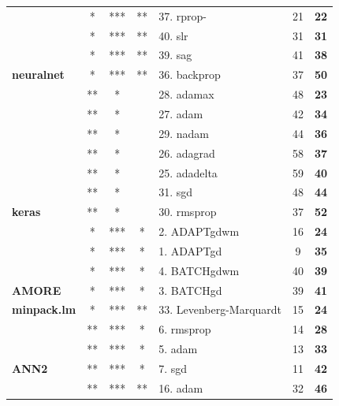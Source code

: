 \begin{Schunk}
\begin{table}
\begin{tabular}[t]{>{}lccclc>{}c}
 & * & *** & ** & 37. rprop- & 21 & \textbf{22}\\

 & * & *** & ** & 40. slr & 31 & \textbf{31}\\

 & * & *** & ** & 39. sag & 41 & \textbf{38}\\

\multirow{-5}{*}{\raggedright\arraybackslash \textbf{neuralnet}} & * & *** & ** & 36. backprop & 37 & \textbf{50}\\
\cmidrule{1-7}
 & ** & * &  & 28. adamax & 48 & \textbf{23}\\

 & ** & * &  & 27. adam & 42 & \textbf{34}\\

 & ** & * &  & 29. nadam & 44 & \textbf{36}\\

 & ** & * &  & 26. adagrad & 58 & \textbf{37}\\

 & ** & * &  & 25. adadelta & 59 & \textbf{40}\\

 & ** & * &  & 31. sgd & 48 & \textbf{44}\\

\multirow{-7}{*}{\raggedright\arraybackslash \textbf{keras}} & ** & * &  & 30. rmsprop & 37 & \textbf{52}\\
\cmidrule{1-7}
 & * & *** & * & 2. ADAPTgdwm & 16 & \textbf{24}\\

 & * & *** & * & 1. ADAPTgd & 9 & \textbf{35}\\

 & * & *** & * & 4. BATCHgdwm & 40 & \textbf{39}\\

\multirow{-4}{*}{\raggedright\arraybackslash \textbf{AMORE}} & * & *** & * & 3. BATCHgd & 39 & \textbf{41}\\
\cmidrule{1-7}
\textbf{minpack.lm} & * & *** & ** & 33. Levenberg-Marquardt & 15 & \textbf{24}\\
\cmidrule{1-7}
 & ** & *** & * & 6. rmsprop & 14 & \textbf{28}\\

 & ** & *** & * & 5. adam & 13 & \textbf{33}\\

\multirow{-3}{*}{\raggedright\arraybackslash \textbf{ANN2}} & ** & *** & * & 7. sgd & 11 & \textbf{42}\\
\cmidrule{1-7}
 & ** & *** & ** & 16. adam & 32 & \textbf{46}\\


\end{tabular}
\end{table}
\end{Schunk}
